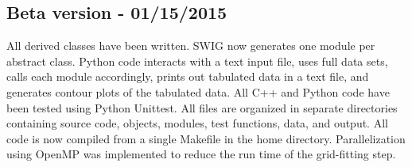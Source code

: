 \documentclass[11pt]{article}
\begin{document}
\subsection{Beta version - 01/15/2015}
All derived classes have been written. SWIG now generates one module
per abstract class. Python code interacts with a text input file, uses
full data sets, calls each module accordingly, prints out tabulated
data in a text file, and generates contour plots of the tabulated
data. All C++ and Python code have been tested using Python
Unittest. All files are organized in separate directories containing
source code, objects, modules, test functions, data, and output. All
code is now compiled from a single Makefile in the home
directory. Parallelization using OpenMP was implemented to reduce the
run time of the grid-fitting step.

\end{document}
